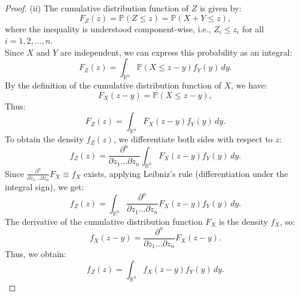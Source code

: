 \documentclass[a4paper,10pt]{article}
\begin{document}
\begin{proof}
(ii) The cumulative distribution function of $Z$ is given by:
\begin{equation*}
F_Z(z) = \mathbb{P}(Z \leq z) = \mathbb{P}(X + Y \leq z),
\end{equation*}
where the inequality is understood component-wise, i.e., $Z_i \leq z_i$ for all $i = 1, 2, \dots, n$.
\\Since $X$ and $Y$ are independent, we can express this probability as an integral:
\begin{equation*}
F_Z(z) = \int_{\mathbb{R}^n} \mathbb{P}(X \leq z - y) f_Y(y) \, dy.
\end{equation*}
By the definition of the cumulative distribution function of $X$, we have:
\begin{equation*}
F_X(z - y) = \mathbb{P}(X \leq z - y),
\end{equation*}
Thus:
\begin{equation*}
F_Z(z) = \int_{\mathbb{R}^n} F_X(z - y) f_Y(y) \, dy.
\end{equation*}
To obtain the density $f_Z(z)$, we differentiate both sides with respect to $z$:
\begin{equation*}
f_Z(z) = \frac{\partial^n}{\partial z_1 \dots \partial z_n} \int_{\mathbb{R}^n} F_X(z - y) f_Y(y) \, dy.
\end{equation*}
Since $\frac{\partial^n}{\partial z_1 \dots \partial z_n} F_X \equiv f_X$ exists, applying Leibniz's rule (differentiation under the integral sign), we get:
\begin{equation*}
f_Z(z) = \int_{\mathbb{R}^n} \frac{\partial^n}{\partial z_1 \dots \partial z_n} F_X(z - y) f_Y(y) \, dy.
\end{equation*}
The derivative of the cumulative distribution function $F_X$ is the density $f_X$, so:
\begin{equation*}
f_X(z - y) = \frac{\partial^n}{\partial z_1 \dots \partial z_n} F_X(z - y).
\end{equation*}
Thus, we obtain:
\begin{equation*}
f_Z(z) = \int_{\mathbb{R}^n} f_X(z - y) f_Y(y) \, dy.
\end{equation*}
\end{proof}
\end{document}
